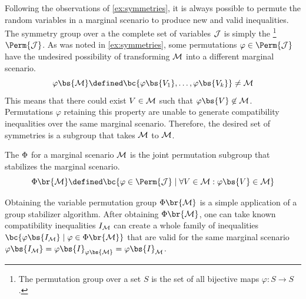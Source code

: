 \documentclass[aps, 10pt, english, twoside, pra, nofootinbib, tightenlines, longbibliography]{revtex4-1}
\begin{document}
    Following the observations of \cref{ex:symmetries}, it is always possible to permute the random variables in a marginal scenario to produce new and valid inequalities. The symmetry group over a the complete set of variables $\mathcal{J}$ is simply the \footnote{The permutation group over a set $S$ is the set of all bijective maps $\varphi : S \to S$.} $\Perm{\jointvar}$. As was noted in \cref{ex:symmetries}, some permutations $\varphi \in \Perm{\jointvar}$ have the undesired possibility of transforming $\mathcal{M}$ into a different marginal scenario.
    \[ \varphi\bs{\mscenario} \defined \bc{\varphi\bs{V_1}, \ldots, \varphi\bs{V_k}} \neq \mscenario \]
    This means that there could exist $V \in \mathcal{M}$ such that $\varphi\bs{V} \not \in \mscenario$. Permutations $\varphi$ retaining this property are unable to generate compatibility inequalities over the same marginal scenario. Therefore, the desired set of symmetries is a subgroup that takes $\mathcal{M}$ to $\mathcal{M}$.

    \begin{definition}
        The  $\Phi$ for a marginal scenario $\mathcal{M}$ is the joint permutation subgroup that stabilizes the marginal scenario.
        \[ \Phi\br{\mscenario} \defined \bc{\varphi \in \Perm{\jointvar} \mid \forall V \in \mscenario : \varphi\bs{V} \in \mscenario} \]
    \end{definition}

    Obtaining the variable permutation group $\gp\br{\mscenario}$ is a simple application of a group stabilizer algorithm. After obtaining $\gp\br{\mscenario}$, one can take known compatibility inequalities $I_{\mathcal{M}}$ can create a whole family of inequalities $\bc{\varphi\bs{I_{\mscenario}} \mid \varphi \in \gp\br{\mscenario}}$ that are valid for the same marginal scenario $\varphi\bs{I_{\mscenario}} = \varphi\bs{I}_{\varphi\bs{\mscenario}} = \varphi\bs{I}_{\mscenario}$.
\end{document}
